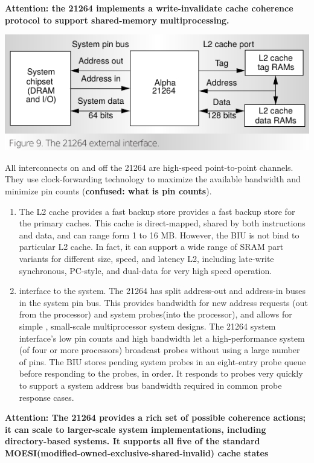 \documentclass[11pt]{article}
\begin{document}
\begin{itemize}
	\textbf{Attention: the 21264 implements a write-invalidate cache coherence protocol to support shared-memory multiprocessing.}
	\begin{center}
		\includegraphics[scale=0.5]{BIU.png}
	\end{center}
	All interconnects on and off the 21264 are high-speed point-to-point channels. They use clock-forwarding technology to maximize the available bandwidth and minimize pin counts (\textbf{confused: what is pin counts}).
	\begin{enumerate}
		\item The L2 cache provides a fast backup store provides a fast backup store for the primary caches. This cache is direct-mapped, shared by both instructions and data, and can range form 1 to 16 MB. However, the BIU is not bind to particular L2 cache. In fact, it can support a wide range of SRAM part variants for different size, speed, and latency L2, including late-write synchronous, PC-style, and dual-data for very high speed operation. 
		\item interface to the system. The 21264 has split address-out and address-in buses in the system pin bus. This provides bandwidth for new address requests (out from the processor) and system probes(into the processor), and allows for simple , small-scale multiprocessor system designs. The 21264 system interface's low pin counts and high bandwidth let a high-performance system (of four or more processors) broadcast probes without using a large number of pins. The BIU stores pending system probes in an eight-entry probe queue before responding to the probes, in order. It responds to probes very quickly to support a system address bus bandwidth required in common probe response cases.
	\end{enumerate}
	 \textbf{Attention: The 21264 provides a rich set of possible coherence actions; it can scale to larger-scale system implementations, including directory-based systems. It supports all five of the standard MOESI(modified-owned-exclusive-shared-invalid) cache states}
	 

\end{itemize}
\end{document}

